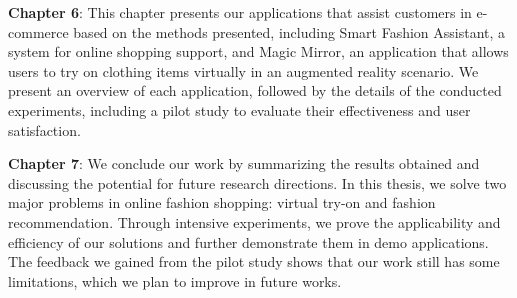 \textbf{Chapter 6}: This chapter presents our applications that assist customers in e-commerce based on the methods presented, including Smart Fashion Assistant, a system for online shopping support, and Magic Mirror, an application that allows users to try on clothing items virtually in an augmented reality scenario. We present an overview of each application, followed by the details of the conducted experiments, including a pilot study to evaluate their effectiveness and user satisfaction.

\textbf{Chapter 7}: We conclude our work by summarizing the results obtained and discussing the potential for future research directions. In this thesis, we solve two major problems in online fashion shopping: virtual try-on and fashion recommendation. Through intensive experiments, we prove the applicability and efficiency of our solutions and further demonstrate them in demo applications. The feedback we gained from the pilot study shows that our work still has some limitations, which we plan to improve in future works.